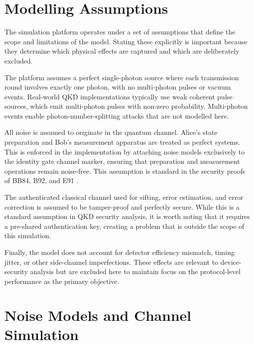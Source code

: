 \documentclass[10pt, a4paper]{report}
\begin{document}
% 


\section{Modelling Assumptions}

The simulation platform operates under a set of assumptions that define the scope and limitations of the model. Stating these explicitly is important because they determine which physical effects are captured and which are deliberately excluded.

The platform assumes a perfect single-photon source where each transmission round involves exactly one photon, with no multi-photon pulses or vacuum events. Real-world QKD implementations typically use weak coherent pulse sources, which emit multi-photon pulses with non-zero probability. Multi-photon events enable photon-number-splitting attacks that are not modelled here.

All noise is assumed to originate in the quantum channel. Alice's state preparation and Bob's measurement apparatus are treated as perfect systems. This is enforced in the implementation by attaching noise models exclusively to the identity gate channel marker, ensuring that preparation and measurement operations remain noise-free. This assumption is standard in the security proofs of BB84, B92, and E91 \cite{ShorPreskill2000, Scarani2009}.

The authenticated classical channel used for sifting, error estimation, and error correction is assumed to be tamper-proof and perfectly secure. While this is a standard assumption in QKD security analysis, it is worth noting that it requires a pre-shared authentication key, creating a problem that is outside the scope of this simulation.

Finally, the model does not account for detector efficiency mismatch, timing jitter, or other side-channel imperfections. These effects are relevant to device-security analysis but are excluded here to maintain focus on the protocol-level performance as the primary objective.


\section{Noise Models and Channel Simulation}
\end{document}
